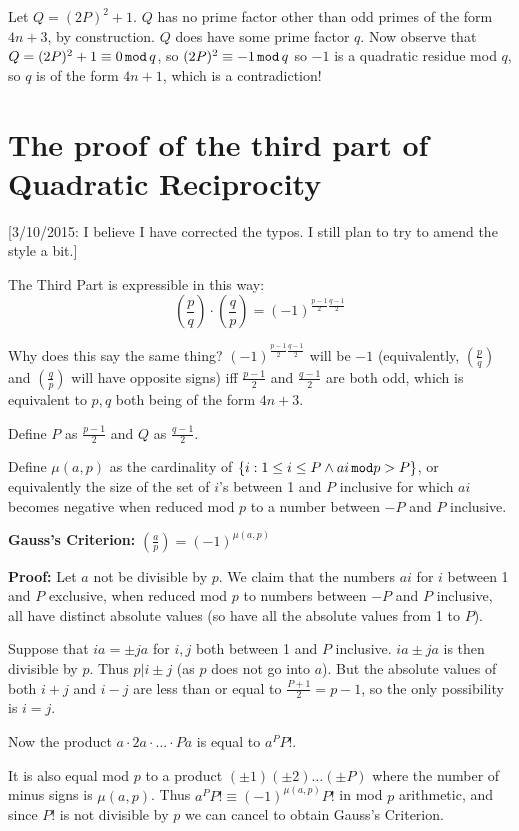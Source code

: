 \documentclass[12pt]{article}
\begin{document}
Let $Q=(2P)^2+1$.  $Q$ has no prime factor other than odd primes of the form $4n+3$, by construction.   $Q$ does have some prime factor $q$.   Now observe that $Q=(2P)^2+1 \equiv 0 \,{\tt mod} \,q$, so $(2P)^2 \equiv -1 \,{\tt mod} \,q$ so $-1$ is a quadratic residue mod $q$, so $q$ is of the form $4n+1$, which is a contradiction!


\section{The proof of the third part of Quadratic Reciprocity}

[3/10/2015:  I believe I have corrected the typos.  I still plan to try to amend the style a bit.]

The Third Part is expressible in this way:  $$\left(\frac pq\right)\cdot \left(\frac qp\right)=(-1)^{\frac{p-1}2\frac{q-1}2}$$

Why does this say the same thing?  $(-1)^{\frac{p-1}2\frac{q-1}2}$ will be $-1$ (equivalently, $\left(\frac pq\right)$ and $\left(\frac qp\right)$ will have opposite signs) iff $\frac{p-1}2$ and $\frac{q-1}2$ are both odd, which is equivalent to $p,q$ both being of the form $4n+3$.

Define $P$ as $\frac{p-1}2$ and $Q$ as $\frac{q-1}2$.

Define $\mu(a,p)$ as the cardinality of $\{i:  1 \leq i \leq P \wedge ai \,{\tt mod} p>P\}$, or equivalently the size of the set of $i$'s between 1 and $P$ inclusive for which $ai$  becomes negative when reduced mod $p$ to a number between $-P$ and $P$ inclusive.

{\bf Gauss's Criterion:}  $\left(\frac ap\right)=(-1)^{\mu(a,p)}$

{\bf Proof:}  Let $a$ not be divisible by $p$.  We claim that the numbers $ai$ for $i$ between 1 and $P$ exclusive, when reduced mod $p$ to numbers between $-P$ and $P$ inclusive, all have distinct absolute values (so have all the absolute values from 1 to $P$).

Suppose that $ia = \pm ja$ for $i,j$ both between 1 and $P$ inclusive.  $ia \pm ja$ is then divisible by $p$.  Thus $p | i\pm j$ (as $p$ does not go into $a$).  But the absolute values of both $i+j$ and $i-j$ are less than or equal to $\frac{P+1}2 = p-1$,
so the only possibility is $i=j$.

Now the product $a \cdot 2a \cdot \ldots \cdot Pa$ is equal to $a^PP!$.

It is also equal mod $p$ to a product $(\pm 1)(\pm 2)\ldots(\pm P)$ where the number of minus signs is $\mu(a,p)$.   Thus $a^PP! \equiv (-1)^{\mu(a,p)}P!$ in mod $p$ arithmetic, and since $P!$ is not divisible by $p$ we can cancel to obtain Gauss's Criterion.
\end{document}
